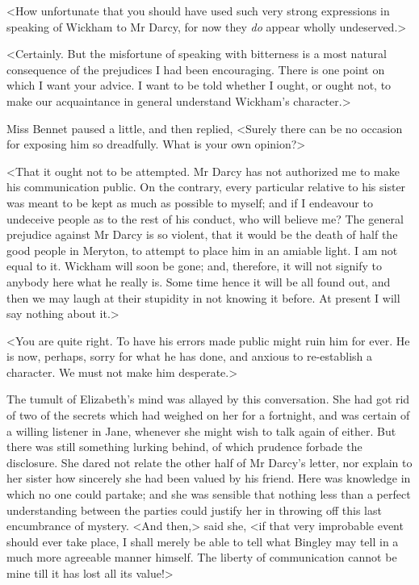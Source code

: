 <How unfortunate that you should have used such very strong expressions in speaking of Wickham to Mr Darcy, for now they \textit{do} appear wholly undeserved.>

<Certainly. But the misfortune of speaking with bitterness is a most natural consequence of the prejudices I had been encouraging. There is one point on which I want your advice. I want to be told whether I ought, or ought not, to make our acquaintance in general understand Wickham's character.>

Miss Bennet paused a little, and then replied, <Surely there can be no occasion for exposing him so dreadfully. What is your own opinion?>

<That it ought not to be attempted. Mr Darcy has not authorized me to make his communication public. On the contrary, every particular relative to his sister was meant to be kept as much as possible to myself; and if I endeavour to undeceive people as to the rest of his conduct, who will believe me? The general prejudice against Mr Darcy is so violent, that it would be the death of half the good people in Meryton, to attempt to place him in an amiable light. I am not equal to it. Wickham will soon be gone; and, therefore, it will not signify to anybody here what he really is. Some time hence it will be all found out, and then we may laugh at their stupidity in not knowing it before. At present I will say nothing about it.>

<You are quite right. To have his errors made public might ruin him for ever. He is now, perhaps, sorry for what he has done, and anxious to re-establish a character. We must not make him desperate.>

The tumult of Elizabeth's mind was allayed by this conversation. She had got rid of two of the secrets which had weighed on her for a fortnight, and was certain of a willing listener in Jane, whenever she might wish to talk again of either. But there was still something lurking behind, of which prudence forbade the disclosure. She dared not relate the other half of Mr Darcy's letter, nor explain to her sister how sincerely she had been valued by his friend. Here was knowledge in which no one could partake; and she was sensible that nothing less than a perfect understanding between the parties could justify her in throwing off this last encumbrance of mystery. <And then,> said she, <if that very improbable event should ever take place, I shall merely be able to tell what Bingley may tell in a much more agreeable manner himself. The liberty of communication cannot be mine till it has lost all its value!>

